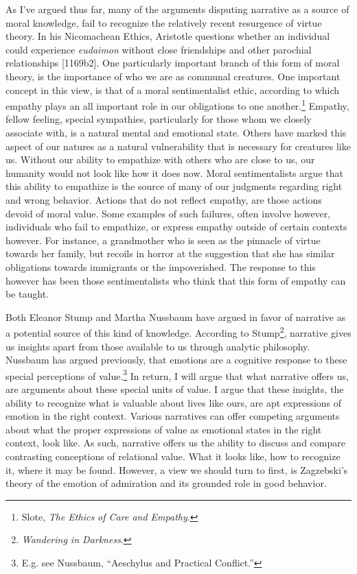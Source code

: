 \documentclass[phdthesis,12pt,final]{wuthesis}
\theoremstyle{definition}
\theoremstyle{definition}
\theoremstyle{definition}
\theoremstyle{definition}
\theoremstyle{remark}
\begin{document}
As I've argued thus far, many of the arguments disputing narrative as a source of moral knowledge, fail to recognize the relatively recent resurgence of virtue theory. In his Nicomachean Ethics, Aristotle questions whether an individual could experience \emph{eudaimon} without close friendships and other parochial relationships {[}1169b2{]}. One particularly important branch of this form of moral theory, is the importance of who we are as communal creatures. One important concept in this view, is that of a moral sentimentalist ethic, according to which empathy plays an all important role in our obligations to one another.\footnote{Slote, \emph{The {Ethics} of {Care} and {Empathy}}.} Empathy, fellow feeling, special sympathies, particularly for those whom we closely associate with, is a natural mental and emotional state. Others have marked this aspect of our natures as a natural vulnerability that is necessary for creatures like us. Without our ability to empathize with others who are close to us, our humanity would not look like how it does now. Moral sentimentalists argue that this ability to empathize is the source of many of our judgments regarding right and wrong behavior. Actions that do not reflect empathy, are those actions devoid of moral value. Some examples of such failures, often involve however, individuals who fail to empathize, or express empathy outside of certain contexts however. For instance, a grandmother who is seen as the pinnacle of virtue towards her family, but recoils in horror at the suggestion that she has similar obligations towards immigrants or the impoverished. The response to this however has been those sentimentalists who think that this form of empathy can be taught.

Both Eleanor Stump and Martha Nussbaum have argued in favor of narrative as a potential source of this kind of knowledge. According to Stump\footnote{\emph{Wandering in {Darkness}}.}, narrative gives us insights apart from those available to us through analytic philosophy. Nussbaum has argued previously, that emotions are a cognitive response to these special perceptions of value.\footnote{E.g. see Nussbaum, {``Aeschylus and Practical Conflict.''}} In return, I will argue that what narrative offers us, are arguments about these special units of value. I argue that these insights, the ability to recognize what is valuable about lives like ours, are apt expressions of emotion in the right context. Various narratives can offer competing arguments about what the proper expressions of value as emotional states in the right context, look like. As such, narrative offers us the ability to discuss and compare contrasting conceptions of relational value. What it looks like, how to recognize it, where it may be found. However, a view we should turn to first, is Zagzebski's theory of the emotion of admiration and its grounded role in good behavior.
\end{document}
